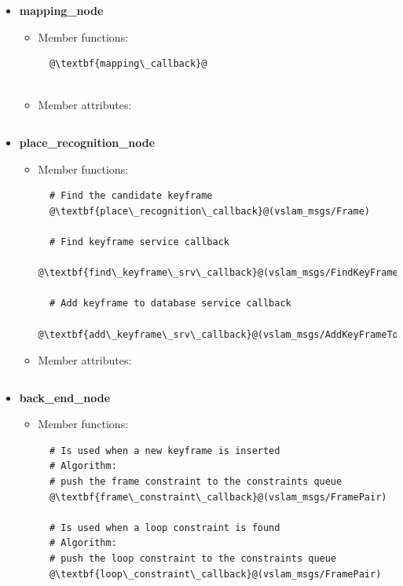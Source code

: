 \begin{itemize}
\begin{itemize}
\begin{lstlisting}
\end{lstlisting}
  \end{itemize} 

  \item \textbf{mapping\_node}
  \begin{itemize}
    \item Member functions:
\begin{lstlisting}
  @\textbf{mapping\_callback}@
  
\end{lstlisting}

    \item Member attributes:
\begin{lstlisting}

\end{lstlisting}
  \end{itemize} 

  \item \textbf{place\_recognition\_node}
  \begin{itemize}
    \item Member functions:
\begin{lstlisting}
  # Find the candidate keyframe
  @\textbf{place\_recognition\_callback}@(vslam_msgs/Frame)
  
  # Find keyframe service callback
  @\textbf{find\_keyframe\_srv\_callback}@(vslam_msgs/FindKeyFrame)

  # Add keyframe to database service callback
  @\textbf{add\_keyframe\_srv\_callback}@(vslam_msgs/AddKeyFrameToDB)
\end{lstlisting}

    \item Member attributes:
\begin{lstlisting}

\end{lstlisting} 
  \end{itemize} 
  \item \textbf{back\_end\_node}
  \begin{itemize}
    \item Member functions:
\begin{lstlisting}
  # Is used when a new keyframe is inserted
  # Algorithm:
  # push the frame constraint to the constraints queue
  @\textbf{frame\_constraint\_callback}@(vslam_msgs/FramePair)

  # Is used when a loop constraint is found
  # Algorithm:
  # push the loop constraint to the constraints queue
  @\textbf{loop\_constraint\_callback}@(vslam_msgs/FramePair)


\end{lstlisting}
\end{itemize}
\end{itemize}
